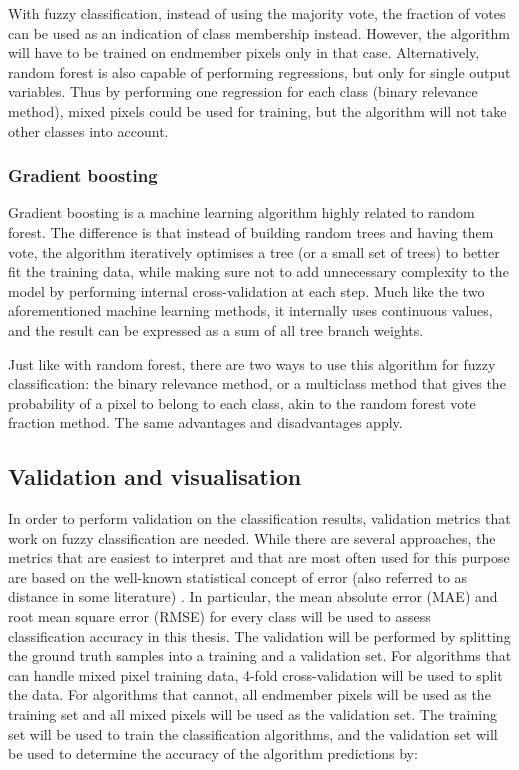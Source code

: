 \documentclass[a4paper,10pt]{article}
\begin{document}
With fuzzy classification, instead of using the majority vote, the fraction of votes can be used as an indication of class membership instead. However, the algorithm will have to be trained on endmember pixels only in that case. Alternatively, random forest is also capable of performing regressions, but only for single output variables. Thus by performing one regression for each class (binary relevance method), mixed pixels could be used for training, but the algorithm will not take other classes into account.

\subsubsection{Gradient boosting}

Gradient boosting is a machine learning algorithm highly related to random forest. The difference is that instead of building random trees and having them vote, the algorithm iteratively optimises a tree (or a small set of trees) to better fit the training data, while making sure not to add unnecessary complexity to the model by performing internal cross-validation at each step. Much like the two aforementioned machine learning methods, it internally uses continuous values, and the result can be expressed as a sum of all tree branch weights. \citep{friedman2001gradientboost}

Just like with random forest, there are two ways to use this algorithm for fuzzy classification: the binary relevance method, or a multiclass method that gives the probability of a pixel to belong to each class, akin to the random forest vote fraction method. The same advantages and disadvantages apply.

\subsection{Validation and visualisation}

In order to perform validation on the classification results, validation metrics that work on fuzzy classification are needed. While there are several approaches, the metrics that are easiest to interpret and that are most often used for this purpose are based on the well-known statistical concept of error (also referred to as distance in some literature) \citep{foody1996fuzzyevaluation}. In particular, the mean absolute error (MAE) and root mean square error (RMSE) for every class will be used to assess classification accuracy in this thesis. The validation will be performed by splitting the ground truth samples into a training and a validation set. For algorithms that can handle mixed pixel training data, 4-fold cross-validation will be used to split the data. For algorithms that cannot, all endmember pixels will be used as the training set and all mixed pixels will be used as the validation set. The training set will be used to train the classification algorithms, and the validation set will be used to determine the accuracy of the algorithm predictions by:
\end{document}
